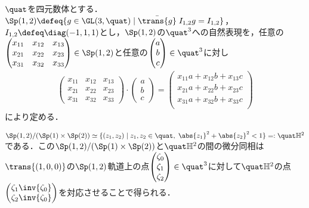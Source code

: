\begin{nttdef}\label{nttdef:1127-main}
  
  $\quat$を四元数体とする．${\Sp(1,2)\defeq \{g\in \GL(3,\quat)\mid \bar{\trans{g}}\; I_{1,2}g = I_{1,2}  \}} $，$I_{1,2} \defeq \diag(-1,1,1) $とし，$\Sp(1,2) $の$\quat^3 $への自然表現を，任意の$\begin{pmatrix}
    x_{11} & x_{12} & x_{13}\\ x_{21} & x_{22} & x_{23}\\ x_{31} & x_{32} & x_{33}
  \end{pmatrix}\in \Sp(1,2)$と任意の$\begin{pmatrix}
    a \\ b \\c
  \end{pmatrix}\in \quat^3 $に対し
  \begin{align*}
    \begin{pmatrix}
      x_{11} & x_{12} & x_{13}\\ x_{21} & x_{22} & x_{23}\\ x_{31} & x_{32} & x_{33}
    \end{pmatrix}\cdot
                                                                              \begin{pmatrix}
                                                                                a \\ b \\c
                                                                              \end{pmatrix}
    =
    \begin{pmatrix}
      x_{11}a + x_{12}b + x_{13}c\\ x_{21}a + x_{22}b + x_{23}c\\ x_{31}a + x_{32}b + x_{33}c\\    
    \end{pmatrix}
  \end{align*}
  により定める．
  
  $\Sp(1,2)/(\Sp(1)\times \Sp(2)) \simeq \{(z_1, z_2)\mid z_1,z_2\in \quat ,\; \abs{z_1}^2 + \abs{z_2}^2   < 1 \} =: \quat\mathbb{H}^2 $である．この$\Sp(1,2)/(\Sp(1)\times \Sp(2)) $と$\quat\mathbb{H}^2$の間の微分同相は$\trans{(1,0,0)} $の$\Sp(1,2)$軌道上の点$
  \begin{pmatrix}
    \zeta_0 \\ \zeta_1 \\ \zeta_2 
  \end{pmatrix}
  \in \quat^3$に対して$\quat\mathbb{H}^2$の点$\begin{pmatrix}
    \zeta_1\inv{\zeta_0} \\ \zeta_2 \inv{\zeta_0}
  \end{pmatrix}$を対応させることで得られる．


\end{nttdef}
